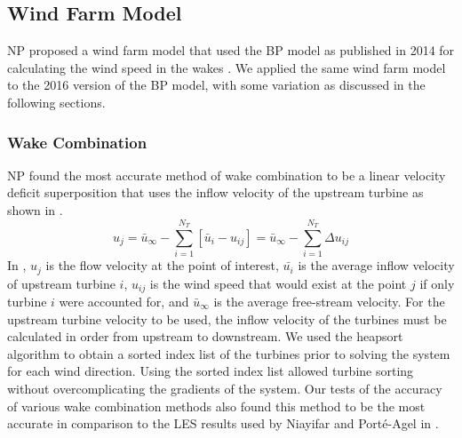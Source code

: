 \documentclass[conf]{new-aiaa}
\begin{document}
\subsection{Wind Farm Model}\label{sec:npa}
NP proposed a wind farm model that used the BP model as published in 2014 \cite{bastankhah2014} for calculating the wind speed in the wakes \cite{niayifar2015, niayifar2016}. We applied the same wind farm model to the 2016 version of the BP model, with some variation as discussed in the following sections.
\subsubsection{Wake Combination}
NP found the most accurate method of wake combination to be a linear velocity deficit superposition that uses the inflow velocity of the upstream turbine as shown in . 
%
\begin{equation}\label{eq:wake-comb-lin}
	u_j = \bar{u}_\infty - \sum_{i=1}^{N_T} [\bar{u}_i - u_{ij}] = \bar{u}_\infty - \sum_{i=1}^{N_T} \Delta u_{ij}
\end{equation}
%
In , $u_j$ is the flow velocity at the point of interest, $\bar{u_i}$ is the average inflow velocity of upstream turbine $i$, $u_{ij}$ is the wind speed that would exist at the point $j$ if only turbine $i$ were accounted for, and $\bar{u}_{\infty}$ is the average free-stream velocity. For the upstream turbine velocity to be used, the inflow velocity of the turbines must be calculated in order from upstream to downstream. We used the heapsort algorithm to obtain a sorted index list of the turbines prior to solving the system for each wind direction. Using the sorted index list allowed turbine sorting without overcomplicating the gradients of the system. Our tests of the accuracy of various wake combination methods also found this method to be the most accurate in comparison to the LES results used by Niayifar and Port\'{e}-Agel in \cite{niayifar2016}.
\end{document}
